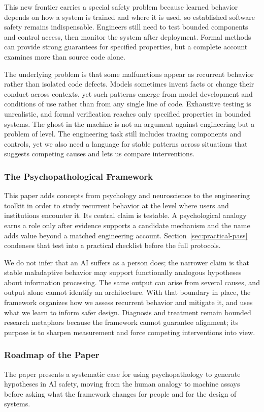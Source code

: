 \documentclass{article}
\begin{document}
This new frontier carries a special safety problem because learned behavior depends on how a system is trained and where it is used, so established software safety remains indispensable. Engineers still need to test bounded components and control access, then monitor the system after deployment. Formal methods can provide strong guarantees for specified properties, but a complete account examines more than source code alone.

The underlying problem is that some malfunctions appear as recurrent behavior rather than isolated code defects. Models sometimes invent facts or change their conduct across contexts, yet such patterns emerge from model development and conditions of use rather than from any single line of code. Exhaustive testing is unrealistic, and formal verification reaches only specified properties in bounded systems. The ghost in the machine is not an argument against engineering but a problem of level. The engineering task still includes tracing components and controls, yet we also need a language for stable patterns across situations that suggests competing causes and lets us compare interventions.
\subsubsection{The Psychopathological Framework}
This paper adds concepts from psychology and neuroscience to the engineering toolkit in order to study recurrent behavior at the level where users and institutions encounter it. Its central claim is testable. A psychological analogy earns a role only after evidence supports a candidate mechanism and the name adds value beyond a matched engineering account. Section~\ref{sec:practical-pass} condenses that test into a practical checklist before the full protocols.

We do not infer that an AI suffers as a person does; the narrower claim is that stable maladaptive behavior may support functionally analogous hypotheses about information processing. The same output can arise from several causes, and output alone cannot identify an architecture. With that boundary in place, the framework organizes how we assess recurrent behavior and mitigate it, and uses what we learn to inform safer design. Diagnosis and treatment remain bounded research metaphors because the framework cannot guarantee alignment; its purpose is to sharpen measurement and force competing interventions into view.
\subsubsection{Roadmap of the Paper}
The paper presents a systematic case for using psychopathology to generate hypotheses in AI safety, moving from the human analogy to machine assays before asking what the framework changes for people and for the design of systems.
\end{document}
